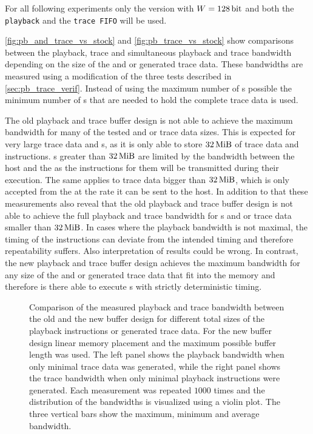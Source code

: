 For all following experiments only the version with $W = \SI{128}{\bit}$ and both the \texttt{playback} and the \texttt{trace FIFO} will be used.

\autoref{fig:pb_and_trace_vs_stock} and \autoref{fig:pb_trace_vs_stock} show comparisons between the playback, trace and simultaneous playback and trace bandwidth depending on the size of the \PlaybackProgram{} and or generated trace data. These bandwidths are measured using a modification of the three tests described in \autoref{sec:pb_trace_verif}. Instead of using the maximum number of \descriptor{}s possible the minimum number of \descriptor{}s that are needed to hold the complete \PlaybackProgram{} trace data is used.

The old playback and trace buffer design is not able to achieve the maximum bandwidth for many of the tested \PlaybackProgram{} and or trace data sizes. This is expected for very large trace data and \PlaybackProgram{}s, as it is only able to store $\SI{32}{\mebi\byte}$ of trace data and \PlaybackProgram{} instructions. \PlaybackProgram{}s greater than $\SI{32}{\mebi\byte}$ are limited by the bandwidth between the host and the \FPGA{} as the instructions for them will be transmitted during their execution. The same applies to trace data bigger than $\SI{32}{\mebi\byte}$, which is only accepted from the \pbexec{} at the rate it can be sent to the host.
In addition to that these measurements also reveal that the old playback and trace buffer design is not able to achieve the full playback and trace bandwidth for \PlaybackProgram{}s and or trace data smaller than $\SI{32}{\mebi\byte}$. In cases where the playback bandwidth is not maximal, the timing of the instructions can deviate from the intended timing and therefore repeatability suffers. Also interpretation of results could be wrong. In contrast, the new playback and trace buffer design achieves the maximum bandwidth for any size of the \PlaybackProgram{} and or generated trace data that fit into the memory and therefore is there able to execute \PlaybackProgram{}s with strictly deterministic timing.

\begin{figure}
\caption{Comparison of the measured playback and trace bandwidth between the old and the new buffer design for different total sizes of the playback instructions or generated trace data. For the new buffer design linear memory placement and the maximum possible buffer length was used. The left panel shows the playback bandwidth when only minimal trace data was generated, while the right panel shows the trace bandwidth when only minimal playback instructions were generated. Each measurement was repeated $\num{1000}$ times and the distribution of the bandwidths is visualized using a violin plot. The three vertical bars show the maximum, minimum and average bandwidth.}\label{fig:pb_and_trace_vs_stock}
\end{figure}

